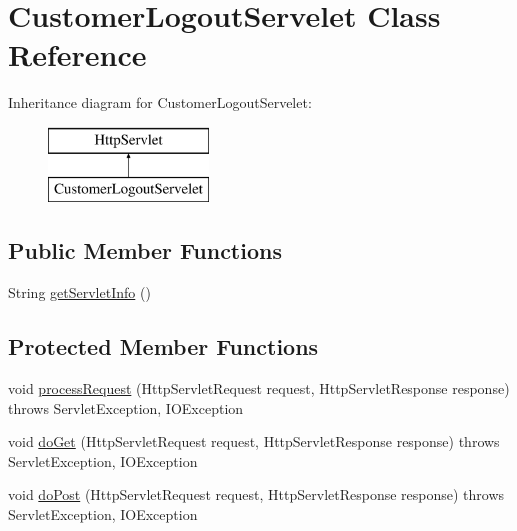 \hypertarget{class_customer_logout_servelet}{}\section{Customer\+Logout\+Servelet Class Reference}
\label{class_customer_logout_servelet}
Inheritance diagram for Customer\+Logout\+Servelet\+:\begin{figure}[H]
\begin{center}
\leavevmode
\includegraphics[height=2.000000cm]{class_customer_logout_servelet}
\end{center}
\end{figure}
\subsection*{Public Member Functions}
\begin{DoxyCompactItemize}
\item 
String \mbox{\hyperlink{class_customer_logout_servelet_a171129d06a58f02bcc8d473e55abf47c}{get\+Servlet\+Info}} ()
\end{DoxyCompactItemize}
\subsection*{Protected Member Functions}
\begin{DoxyCompactItemize}
\item 
void \mbox{\hyperlink{class_customer_logout_servelet_ae054a92974c047b987a6b978da7933bf}{process\+Request}} (Http\+Servlet\+Request request, Http\+Servlet\+Response response)  throws Servlet\+Exception, I\+O\+Exception 
\item 
void \mbox{\hyperlink{class_customer_logout_servelet_a72e196fe29f23ff2e9aec1d0537b20a9}{do\+Get}} (Http\+Servlet\+Request request, Http\+Servlet\+Response response)  throws Servlet\+Exception, I\+O\+Exception 
\item 
void \mbox{\hyperlink{class_customer_logout_servelet_aa53ae0f8d85d6e606c1ba73ee0323154}{do\+Post}} (Http\+Servlet\+Request request, Http\+Servlet\+Response response)  throws Servlet\+Exception, I\+O\+Exception 
\end{DoxyCompactItemize}


